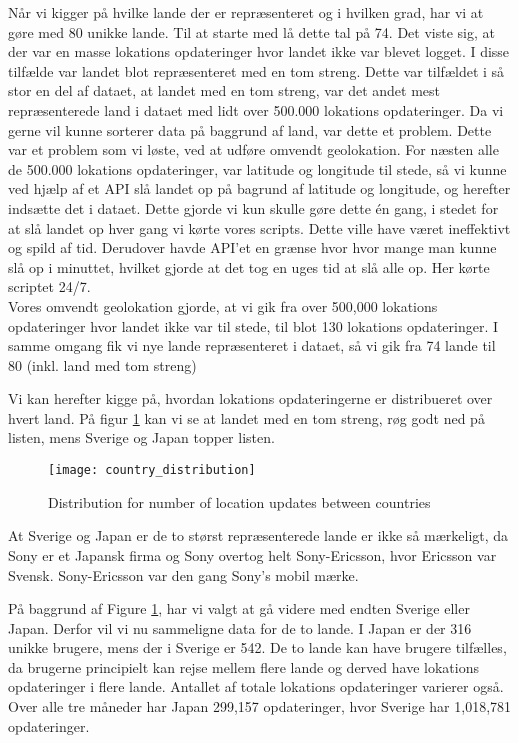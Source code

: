 Når vi kigger på hvilke lande der er repræsenteret og i hvilken grad, har vi at gøre med 80 unikke lande. Til at starte med lå dette tal på 74. Det viste sig, at der var en masse lokations opdateringer hvor landet ikke var blevet logget. I disse tilfælde var landet blot repræsenteret med en tom streng. Dette var tilfældet i så stor en del af dataet, at landet med en tom streng, var det andet mest repræsenterede land i dataet med lidt over 500.000 lokations opdateringer. 
Da vi gerne vil kunne sorterer data på baggrund af land, var dette et problem. Dette var et problem som vi løste, ved at udføre omvendt geolokation. For næsten alle de 500.000 lokations opdateringer, var latitude og longitude til stede, så vi kunne ved hjælp af et API\cite{reversegeocode} slå landet op på bagrund af latitude og longitude, og herefter indsætte det i dataet. Dette gjorde vi kun skulle gøre dette én gang, i stedet for at slå landet op hver gang vi kørte vores scripts. Dette ville have været ineffektivt og spild af tid. Derudover havde API'et en grænse hvor hvor mange man kunne slå op i minuttet, hvilket gjorde at det tog en uges tid at slå alle op. Her kørte scriptet 24/7. \\ 
Vores omvendt geolokation gjorde, at vi gik fra over 500,000 lokations opdateringer hvor landet ikke var til stede, til blot 130 lokations opdateringer. I samme omgang fik vi nye lande repræsenteret i dataet, så vi gik fra 74 lande til 80 (inkl. land med tom streng)

Vi kan herefter kigge på, hvordan lokations opdateringerne er distribueret over hvert land. På figur \ref{fig:country_dist} kan vi se at landet med en tom streng, røg godt ned på listen, mens Sverige og Japan topper listen. 


\begin{figure}[H]
    \hspace*{-1.0cm}
    \centering
    \texttt{[image: country\_distribution]}
    \caption{Distribution for number of location updates between countries}
    \label{fig:country_dist}
\end{figure}

At Sverige og Japan er de to størst repræsenterede lande er ikke så mærkeligt, da Sony er et Japansk firma og Sony overtog helt Sony-Ericsson, hvor Ericsson var Svensk. Sony-Ericsson var den gang Sony's mobil mærke. 

På baggrund af Figure \ref{fig:country_dist}, har vi valgt at gå videre med endten Sverige eller Japan. Derfor vil vi nu sammeligne data for de to lande. 
I Japan er der 316 unikke brugere, mens der i Sverige er 542. De to lande kan have brugere tilfælles, da brugerne principielt kan rejse mellem flere lande og derved have lokations opdateringer i flere lande.  
Antallet af totale lokations opdateringer varierer også. Over alle tre måneder har Japan 299,157 opdateringer, hvor Sverige har 1,018,781 opdateringer.

